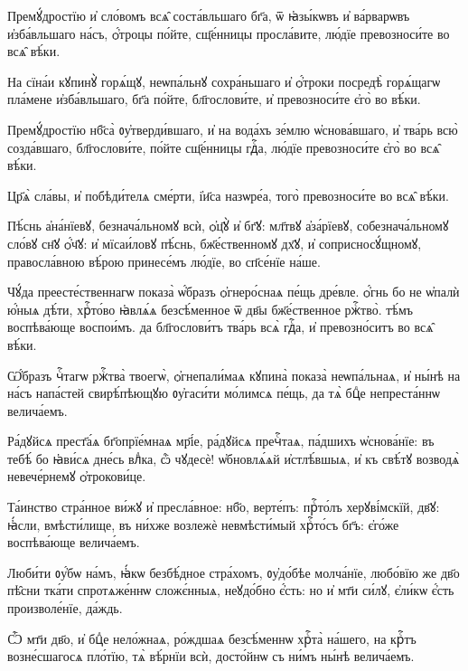 \hKv Премꙋ́дростїю и҆ сло́вомъ всѧ̑ соста́вльшаго бг҃а, ѿ  ꙗ҆зы́кѡвъ и҆ ва́рварѡвъ и҆зба́вльшаго   на́съ, ѻ҆́троцы по́йте, сщ҃е́нницы просла́вите, лю́дїе превозноси́те  во всѧ̑ вѣ́ки. 

\hKv На сїна́и кꙋпинꙋ̀ горѧ́щꙋ, неѡпа́льнꙋ сохра́ньшаго и҆ ѻ҆́троки  посредѣ̀ горѧ́щагѡ пла́мене и҆зба́вльшаго, бг҃а по́йте,  бл҃гослови́те, и҆ превозноси́те є҆го̀ во вѣ́ки. 

\hKv Премꙋ́дростїю нб҃са̀ ᲂу҆тверди́вшаго, и҆ на вода́хъ зе́млю  ѡ҆снова́вшаго, и҆ тва́рь всю̀ созда́вшаго, бл҃гослови́те, по́йте  сщ҃е́нницы гдⷭ҇а, лю́дїе превозноси́те є҆го̀ во всѧ̑ вѣ́ки. 

\hKv Цр҃ѧ̀ сла́вы, и҆ побѣди́телѧ сме́рти, і҆и҃са назѡре́а, того̀  превозноси́те во всѧ̑ вѣ́ки. 

\hKv Пѣ́снь а҆на́нїевꙋ, безнача́льномꙋ всѝ, ѻ҆ц҃ꙋ̀ и҆ бг҃ꙋ: мл҃твꙋ  а҆за́рїевꙋ, собезнача́льномꙋ сло́вꙋ сн҃ꙋ ѻ҆́ч҃ꙋ: и҆ мїсаи́ловꙋ  пѣ́снь, бж҃е́ственномꙋ дх҃ꙋ, и҆ соприсносꙋ́щномꙋ, правосла́вною  вѣ́рою принесе́мъ лю́дїе, во сп҃се́нїе на́ше.

\hKv Чꙋ́да преесте́ственнагѡ показа̀ ѡ҆́бразъ ѻ҆гнеро́снаѧ пе́щь  дре́вле. ѻ҆́гнь бо не ѡ҆палѝ ю҆́ныѧ дѣ́ти, хрⷭ҇то́во ꙗ҆влѧ́ѧ  безсѣ́менное ѿ  дв҃ы бж҃е́ственное  ржⷭ҇тво̀. тѣ́мъ воспѣва́юще воспои́мъ. да бл҃гослови́тъ тва́рь всѧ̀  гдⷭ҇а, и҆ превозно́ситъ во всѧ̑ вѣ́ки. 
%

\hKv Ѡ҆́бразъ чⷭ҇тагѡ ржⷭ҇тва̀ твоегѡ̀, ѻ҆гнепали́маѧ кꙋпина̀ показа̀  неѡпа́льнаѧ, и҆ ны́нѣ на на́съ напа́стей свирѣ́пѣющꙋю ᲂу҆гаси́ти  мо́лимсѧ пе́щь, да тѧ̀ бцⷣе непреста́ннѡ велича́емъ. 

\hKv Ра́дꙋйсѧ прест҃а́ѧ бг҃опрїе́мнаѧ мр҃і́е, ра́дꙋйсѧ пречⷭ҇таѧ,  па́дшихъ ѡ҆снова́нїе: въ тебѣ́ бо ꙗ҆ви́сѧ дне́сь влⷣка, ѽ  чꙋдесѐ! ѡ҆бновлѧ́ѧй и҆стлѣ́вшыѧ, и҆ къ свѣ́тꙋ возводѧ̀  невече́рнемꙋ ѻ҆трокови́це. 
%

\hKv Та́инство стра́нное ви́жꙋ и҆  пресла́вное: нб҃о, верте́пъ: прⷭ҇то́лъ херꙋві́мскїй, дв҃ꙋ: ꙗ҆́сли,  вмѣсти́лище, въ ни́хже возлежѐ невмѣсти́мый хрⷭ҇то́съ бг҃ъ:  є҆го́же воспѣва́юще велича́емъ.  

\hKv Люби́ти ᲂу҆́бѡ на́мъ, ꙗ҆́кѡ безбѣ́дное стра́хомъ, ᲂу҆до́бѣе  молча́нїе, любо́вїю же дв҃о пѣ̑сни тка́ти спротѧже́ннѡ сложє́нныѧ,  неꙋдо́бно є҆́сть: но и҆ мт҃и си́лꙋ, є҆ли́кѡ є҆́сть произволе́нїе,  да́ждь. 
%

\hKv Ѽ мт҃и дв҃о, и҆ бцⷣе нело́жнаѧ, ро́ждшаѧ  безсѣ́меннѡ хрⷭ҇та̀ на́шего, на крⷭ҇тъ возне́сшагосѧ пло́тїю, тѧ̀  вѣ́рнїи всѝ, досто́йнѡ съ ни́мъ ны́нѣ велича́емъ. 
%

